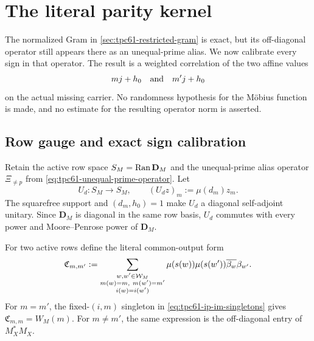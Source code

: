 \section{The literal parity kernel}
\label{sec:tpc61-parity-kernel}

The normalized Gram in \cref{sec:tpc61-restricted-gram} is exact, but its
off-diagonal operator still appears there as an unequal-prime alias.  We now
calibrate every sign in that operator.  The result is a weighted correlation
of the two affine values
\[
 mj+h_0\quad\hbox{and}\quad m'j+h_0
\]
on the actual missing carrier.  No randomness hypothesis for the M\"obius
function is made, and no estimate for the resulting operator norm is asserted.

\subsection{Row gauge and exact sign calibration}

Retain the active row space \(S_M=\operatorname{Ran}\mathbf D_M\) and the unequal-prime
alias operator \(\Xi_{\ne p}\) from
\eqref{eq:tpc61-unequal-prime-operator}.  Let
\begin{equation}
 U_d:S_M\longrightarrow S_M,
 \qquad
 (U_dz)_m:=\mu(d_m)z_m.
 \label{eq:tpc61-source-mobius-gauge}
\end{equation}
The squarefree support and \((d_m,h_0)=1\) make \(U_d\) a diagonal
self-adjoint unitary.  Since \(\mathbf D_M\) is diagonal in the same row
basis, \(U_d\) commutes with every power and Moore--Penrose power of
\(\mathbf D_M\).

For two active rows define the literal common-output form
\begin{equation}
 \mathfrak C_{m,m'}
 :=
 \sum_{\substack{w,w'\in\mathcal W_M\\
                   m(w)=m,\ m(w')=m'\\
                   i(w)=i(w')}}
 \mu(s(w))\mu(s(w'))
 \overline{\beta_w}\beta_{w'}.
 \label{eq:tpc61-common-output-form}
\end{equation}
For \(m=m'\), the fixed-\((i,m)\) singleton in
\eqref{eq:tpc61-ip-im-singletons} gives
\(\mathfrak C_{m,m}=W_M(m)\).  For \(m\ne m'\), the same expression is
the off-diagonal entry of \(M_X^*M_X\).

